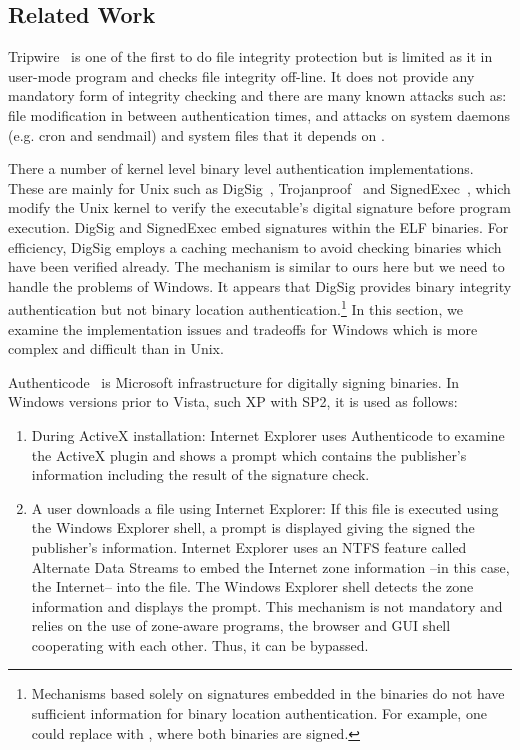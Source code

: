 \subsection{Related Work}
\label{sec:binauth-related}

Tripwire~\cite{kim1994design} is one of the first to do file integrity protection
but is limited as it in user-mode program and 
checks file integrity off-line.
It does not provide any mandatory form of integrity checking and
there are many known attacks such as:
file modification in between authentication times,
and attacks on system daemons (e.g. cron and sendmail)
and system files that it depends on
\cite{arnold2001trouble,slaviero2005attacking}.

There a number of kernel level binary level authentication implementations.
These are mainly for Unix
such as DigSig~\cite{apvrille2004digsig}, Trojanproof~\cite{williams2002anti}
and SignedExec~\cite{doorn01signedexecutables}, which modify the Unix kernel
to verify the executable's digital signature before program execution.
DigSig and SignedExec embed signatures within the ELF binaries.
For efficiency, DigSig employs a caching mechanism to avoid checking
binaries which have been verified already. The mechanism is similar 
to ours here but we need to handle the problems of Windows.
It appears that DigSig provides binary integrity authentication
but not binary location authentication.\footnote{Mechanisms based solely on
signatures embedded in the binaries do not have sufficient information
for binary location authentication.
For example, one could replace  with , where both
binaries are signed.
}
In this section, we examine the implementation issues and tradeoffs
for Windows which is more complex and difficult than in Unix.

Authenticode~\cite{authenticode} is Microsoft infrastructure
for digitally signing binaries.
In Windows versions prior to Vista, such XP with SP2,
it is used as follows:
\begin{enumerate}
\item During ActiveX installation:
Internet Explorer uses Authenticode to examine the ActiveX plugin 
and shows a prompt which contains the publisher's information
including the result of the signature check.
\item A user downloads a file using Internet Explorer:
If this file is executed using the Windows Explorer shell,
a prompt is displayed giving the signed the publisher's information.
Internet Explorer uses an NTFS feature called
Alternate Data Streams to embed the Internet zone information --in this case,
the Internet-- into the file.
The Windows Explorer shell detects the zone information and displays the prompt.
This mechanism is not mandatory and relies on the use of zone-aware programs,
the browser and GUI shell cooperating with each other.
Thus, it can be bypassed.
\end{enumerate}

